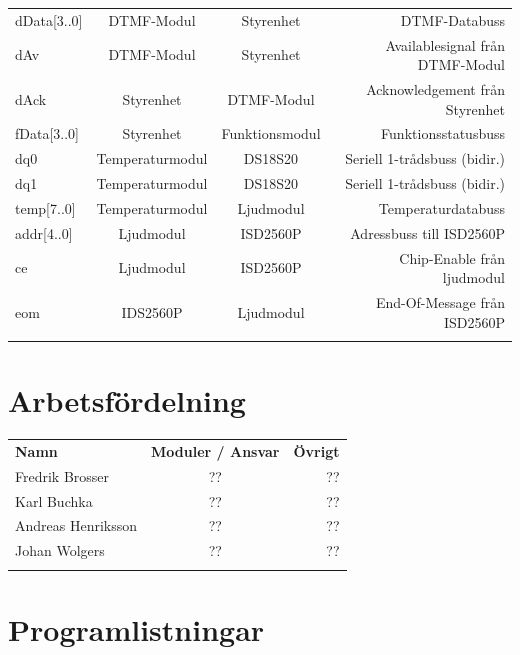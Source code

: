 \documentclass[a4paper,11pt]{article}
\begin{document}
\begin{tabular}{l c c r}
		dData[3..0] & DTMF-Modul & Styrenhet & DTMF-Databuss\\
		dAv & DTMF-Modul & Styrenhet & Availablesignal från DTMF-Modul\\
		dAck & Styrenhet & DTMF-Modul & Acknowledgement från Styrenhet\\

		fData[3..0] & Styrenhet & Funktionsmodul & Funktionsstatusbuss\\

		dq0 & Temperaturmodul & DS18S20 & Seriell 1-trådsbuss (bidir.)\\
		dq1 & Temperaturmodul & DS18S20 & Seriell 1-trådsbuss (bidir.)\\

		temp[7..0] & Temperaturmodul & Ljudmodul & Temperaturdatabuss\\

		addr[4..0] & Ljudmodul & ISD2560P & Adressbuss till ISD2560P\\
		ce & Ljudmodul & ISD2560P & Chip-Enable från ljudmodul\\
		eom & IDS2560P & Ljudmodul & End-Of-Message från ISD2560P\\\\
	\end{tabular}

	\section{Arbetsfördelning}

	\begin{tabular}{l c r}
		\\{\bf Namn} & {\bf Moduler / Ansvar} & {\bf Övrigt}\\
		Fredrik Brosser 	& ?? 	& ??\\
		Karl Buchka 		& ?? 	& ??\\
		Andreas Henriksson 	& ?? 	& ??\\
		Johan Wolgers 		& ??	& ??\\\\
	\end{tabular}

	\section{Programlistningar}
	\label{sec:programlistningar}	
\end{document}
